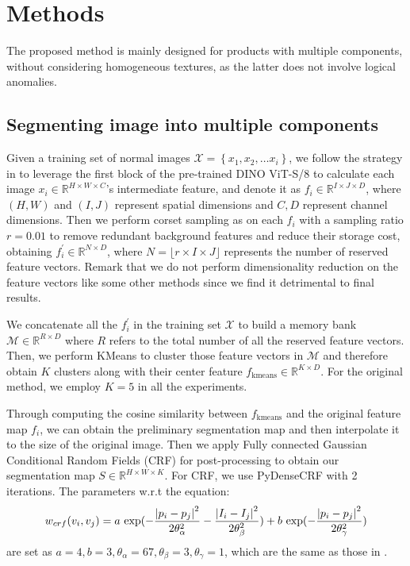 \documentclass[final,5p,times,twocolumn]{elsarticle}
\begin{document}
\section{Methods}
\label{3}
The proposed method is mainly designed for products with multiple components, without considering homogeneous textures, as the latter does not involve logical anomalies.
\subsection{Segmenting image into multiple components}
\label{3.1}
Given a training set of normal images $\mathcal{X}=\left \{ x_1,x_2,\dots x_i  \right \} $, we follow the strategy in \cite{hamilton2022unsupervised} to leverage the first block of the pre-trained DINO ViT-S/8 to calculate each image $x_i \in \mathbb{R}^{H \times W \times C}$'s intermediate feature, and denote it as $f_i \in \mathbb{R}^{I \times J \times D}$, where $(H, W)$ and $(I, J)$ represent spatial dimensions and $C, D$ represent channel dimensions. Then we perform corset sampling as \cite{roth2022towards} on each $f_i$ with a sampling ratio $r=0.01$ to remove redundant background features and reduce their storage cost, obtaining $f^{'}_{i} \in \mathbb{R}^{N\times D}$, where $N=\lfloor {r \times I \times J} \rfloor$ represents the number of reserved feature vectors. Remark that we do not perform dimensionality reduction on the feature vectors like some other methods \cite{roth2022towards, hamilton2022unsupervised} since we find it detrimental to final results. 

We concatenate all the $f^{'}_{i}$ in the training set $\mathcal{X}$ to build a memory bank $\mathcal{M} \in \mathbb{R}^{R \times D}$ where $R$ refers to the total number of all the reserved feature vectors. Then, we perform KMeans to cluster those feature vectors in $\mathcal{M}$ and therefore obtain $K$ clusters along with their center feature $f_{\mathrm{kmeans}} \in \mathbb{R}^{K\times D} $. For the original method, we employ $K=5$ in all the experiments.  


Through computing the cosine similarity between $f_{\mathrm{kmeans}}$ and the original feature map $f_i$, we can obtain the preliminary segmentation map and then interpolate it to the size of the original image. Then we apply Fully connected Gaussian Conditional Random Fields (CRF) \cite{lafferty2001conditional} for post-processing to obtain our segmentation map $S \in \mathbb{R}^{H \times W \times K}$. For CRF, we use PyDenseCRF with 2 iterations. The parameters w.r.t the equation:
\begin{equation}
    w_{crf}(v_i,v_j)=a \ {\rm exp}(-\frac{\left |p_i-p_j  \right |^2 }{2\theta_{\alpha }^2}- \frac{\left |I_i-I_j  \right |^2 }{2\theta_{\beta  }^2})+b \ {\rm exp}(-\frac{\left |p_i-p_j  \right |^2 }{2\theta_{\gamma  }^2})
\end{equation}
are set as $a=4, b=3, \theta_{\alpha}=67, \theta_{\beta}=3, \theta_{\gamma} = 1$, which are the same as those in \cite{hamilton2022unsupervised}. 
\end{document}

